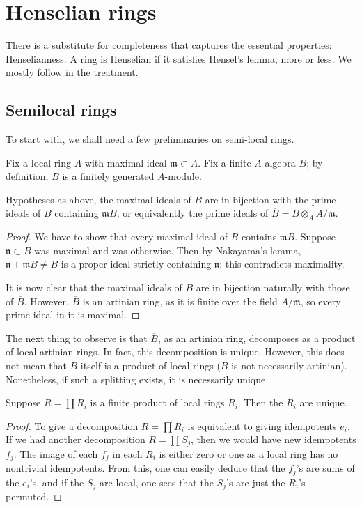 \section{Henselian rings}



There is a substitute for completeness that captures the essential
properties: Henselianness. A ring is Henselian if it satisfies
Hensel's lemma, more or less. We mostly follow \cite{Ra70} in the treatment.

\subsection{Semilocal rings}

To start with, we shall need a few preliminaries on semi-local rings.

Fix a local ring $A$ with maximal ideal $\mathfrak{m} \subset A$.
Fix a finite $A$-algebra $B$; by definition, $B $ is a finitely
generated $A$-module.

\begin{proposition} 
Hypotheses as above, the maximal ideals of $B$ are in bijection with
the prime ideals of $B $ containing $\mathfrak{m} B$, or equivalently
the prime ideals of $\overline{B} = B \otimes_A A/\mathfrak{m}$.
\end{proposition}

\begin{proof} 
We have to show that every maximal ideal of $B$ contains $\mathfrak{m}
B$. Suppose $\mathfrak{n} \subset B$ was maximal and was otherwise.
Then by Nakayama's lemma, $\mathfrak{n} + \mathfrak{m} B \neq B$ is a
proper ideal strictly containing $\mathfrak{n}$; this contradicts
maximality.

It is now clear that the maximal ideals of $B$ are in bijection
naturally with those of $\overline{B}$. 
However, $\overline{B}$ is an artinian ring, as it is finite over the
field $A/\mathfrak{m}$, so every prime ideal in it is maximal.
\end{proof}



The next thing to observe is that $\overline{B}$, as an artinian ring,
decomposes  as a product of local artinian rings.
In fact, this decomposition is unique.
However, this does not mean that $B$ itself 
is a product of local rings ($B$ is not necessarily artinian).
Nonetheless, if such a splitting exists, it is necessarily unique.

\begin{proposition} 
Suppose $R = \prod R_i$ is a finite product of local rings $R_i$. Then
the $R_i$ are unique.
\end{proposition}
\begin{proof} 
To give a decomposition $R = \prod R_i$ is equivalent to giving
idempotents $e_i$. If we had another decomposition $R = \prod S_j$,
then we would have new idempotents $f_j$. The image of each $f_j$ in
each $R_i$ is either zero or one as a local ring has no nontrivial
idempotents. From this, one can easily deduce that the $f_j$'s are
sums of the $e_i$'s, and if the $S_j$ are local, one sees that the
$S_j$'s are just the $R_i$'s permuted. 
\end{proof}


